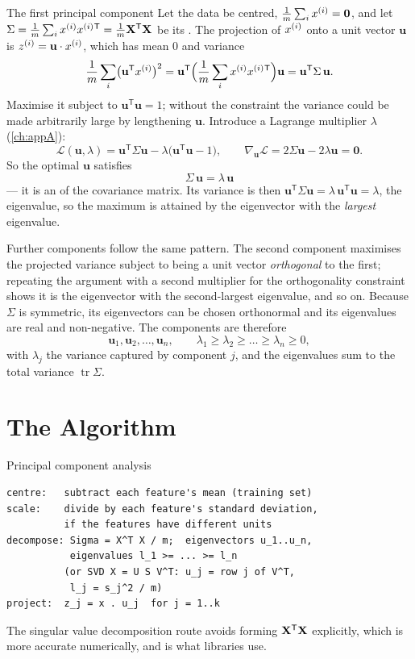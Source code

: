 \begin{derivation}{The first principal component}
Let the data be centred, $\frac1m\sum_ix^{(i)} = \mathbf{0}$, and let
$\Sigma = \frac1m\sum_ix^{(i)}x^{(i)}{}^{\mathsf T} = \frac1m\mathbf{X}^{\mathsf T}\mathbf{X}$
be its . The projection of $x^{(i)}$ onto a unit vector
$\mathbf{u}$ is $z^{(i)} = \mathbf{u}\cdot x^{(i)}$, which has mean $0$ and variance
\[
  \frac1m\sum_i\bigl(\mathbf{u}^{\mathsf T}x^{(i)}\bigr)^2
  = \mathbf{u}^{\mathsf T}\Bigl(\frac1m\sum_ix^{(i)}x^{(i)}{}^{\mathsf T}\Bigr)\mathbf{u}
  = \mathbf{u}^{\mathsf T}\Sigma\,\mathbf{u} .
\]
Maximise it subject to $\mathbf{u}^{\mathsf T}\mathbf{u} = 1$; without the
constraint the variance could be made arbitrarily large by lengthening
$\mathbf{u}$. Introduce a Lagrange multiplier $\lambda$
(\cref{ch:appA}):
\[
  \mathcal{L}(\mathbf{u},\lambda) = \mathbf{u}^{\mathsf T}\Sigma\mathbf{u}
    - \lambda\bigl(\mathbf{u}^{\mathsf T}\mathbf{u} - 1\bigr),
  \qquad
  \nabla_{\mathbf{u}}\mathcal{L} = 2\Sigma\mathbf{u} - 2\lambda\mathbf{u} = \mathbf{0}.
\]
So the optimal $\mathbf{u}$ satisfies
\[
  \boxed{\;\Sigma\,\mathbf{u} = \lambda\,\mathbf{u}\;}
\]
--- it is an  of the covariance matrix. Its variance is then
$\mathbf{u}^{\mathsf T}\Sigma\mathbf{u} = \lambda\,\mathbf{u}^{\mathsf T}\mathbf{u}
= \lambda$, the eigenvalue, so the maximum is attained by the eigenvector with the
\emph{largest} eigenvalue.
\end{derivation}

Further components follow the same pattern. The second component maximises the
projected variance subject to being a unit vector \emph{orthogonal} to the first;
repeating the argument with a second multiplier for the orthogonality constraint
shows it is the eigenvector with the second-largest eigenvalue, and so on. Because
$\Sigma$ is symmetric, its eigenvectors can be chosen orthonormal and its
eigenvalues are real and non-negative. The components are therefore
\[
  \mathbf{u}_1, \mathbf{u}_2, \dots, \mathbf{u}_n, \qquad
  \lambda_1 \ge \lambda_2 \ge \dots \ge \lambda_n \ge 0,
\]
with $\lambda_j$ the variance captured by component $j$, and the eigenvalues sum to
the total variance $\operatorname{tr}\Sigma$.

\section{The Algorithm}
\label{sec:pca-algorithm}

\begin{algorithmbox}{Principal component analysis}
\begin{lstlisting}[style=pseudocode]
centre:   subtract each feature's mean (training set)
scale:    divide by each feature's standard deviation,
          if the features have different units
decompose: Sigma = X^T X / m;  eigenvectors u_1..u_n,
           eigenvalues l_1 >= ... >= l_n
          (or SVD X = U S V^T: u_j = row j of V^T,
           l_j = s_j^2 / m)
project:  z_j = x . u_j  for j = 1..k
\end{lstlisting}
The singular value decomposition route avoids forming $\mathbf{X}^{\mathsf T}\mathbf{X}$
explicitly, which is more accurate numerically, and is what libraries use.
\end{algorithmbox}

